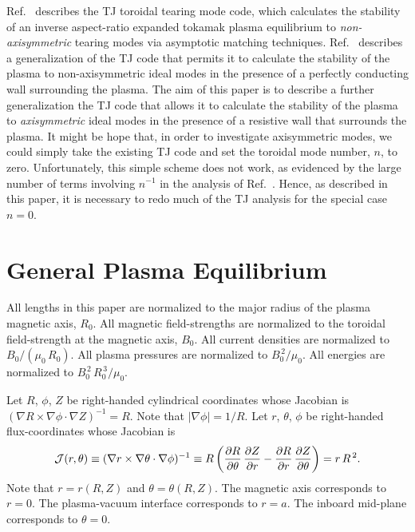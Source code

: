 \documentclass[12pt,prb,aps]{revtex4-1}
\begin{document}
Ref.~ describes the TJ toroidal tearing mode code, which calculates the stability of an inverse aspect-ratio expanded  tokamak plasma equilibrium  to {\em non-axisymmetric}\/ tearing modes via
asymptotic matching techniques. Ref.~ describes a generalization of the TJ code that permits it to calculate the stability of the plasma to non-axisymmetric
ideal modes in the presence of a perfectly conducting wall surrounding the plasma. The aim of this paper is to describe a further generalization the TJ code that  allows it to calculate
the stability of the plasma to {\em axisymmetric}\/ ideal modes in the presence of a resistive wall that surrounds the plasma. It might be hope that, in order to investigate axisymmetric
modes,  we could simply take the existing
TJ code and set the toroidal mode number, $n$, to zero. Unfortunately, this simple scheme does not work, as evidenced by the large number of terms involving
$n^{-1}$ in the analysis of Ref.~. Hence, as described in this paper, it is necessary to redo  much of the TJ analysis for the special case $n=0$. 

\section{General Plasma Equilibrium}\label{geq}
All lengths  in this paper  are normalized to  the major radius of the plasma magnetic axis, $R_0$. All magnetic field-strengths
are normalized to the  toroidal field-strength at the magnetic axis, $B_0$. All current densities are normalized to $B_0/(\mu_0\,R_0)$. 
 All plasma pressures are normalized to $B_0^{\,2}/\mu_0$. All energies are normalized to $B_0^{\,2}\,R_0^{\,3}/\mu_0$. 

Let $R$, $\phi$, $Z$ be right-handed cylindrical coordinates whose Jacobian 
is
$(\nabla R\times \nabla\phi\cdot\nabla Z)^{-1} = R$. 
Note that $|\nabla\phi|=1/R$. 
Let $r$, $\theta$, $\phi$ be right-handed flux-coordinates whose
Jacobian is\,\cite{bussac,connor}
\begin{equation}\label{jac}
{\cal J}(r,\theta)\equiv (\nabla r\times \nabla\theta\cdot\nabla\phi)^{-1} \equiv R\left(\frac{\partial R}{\partial\theta}\,\frac{\partial Z}{\partial r} -\frac{\partial R}{\partial r}\,\frac{\partial Z}{\partial \theta}\right)= r\,R^{\,2}.
\end{equation}
Note that $r=r(R,Z)$ and $\theta=\theta(R,Z)$. 
The magnetic axis corresponds to $r=0$. The plasma-vacuum interface corresponds to $r=a$. The inboard mid-plane corresponds to $\theta=0$. 
\end{document}
